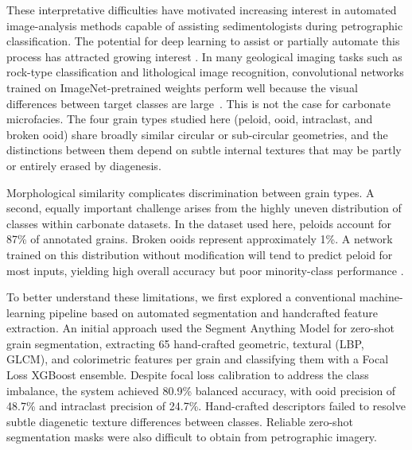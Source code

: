 \documentclass[a4paper,fleqn]{cas-dc}
\begin{document}
These interpretative difficulties have motivated increasing interest in automated image-analysis methods capable of assisting sedimentologists during petrographic classification. The potential for deep learning to assist or partially automate this process has attracted growing interest \citep{koeshidayatullah2020, pireslima2020, liu2020}. In many geological imaging tasks such as rock-type classification and lithological image recognition, convolutional networks trained on ImageNet-pretrained weights perform well because the visual differences between target classes are large~\citep{houshmand2022rock,xu2021deep}. This is not the case for carbonate microfacies. The four grain types studied here (peloid, ooid, intraclast, and broken ooid) share broadly similar circular or sub-circular geometries, and the distinctions between them depend on subtle internal textures that may be partly or entirely erased by diagenesis.

Morphological similarity complicates discrimination between grain types. A second, equally important challenge arises from the highly uneven distribution of classes within carbonate datasets. In the dataset used here, peloids account for 87\% of annotated grains. Broken ooids represent approximately 1\%. A network trained on this distribution without modification will tend to predict peloid for most inputs, yielding high overall accuracy but poor minority-class performance \citep{johnson2019imbalance}.

To better understand these limitations, we first explored a conventional machine-learning pipeline based on automated segmentation and handcrafted feature extraction. An initial approach used the Segment Anything Model \citep{kirillov2023sam} for zero-shot grain segmentation, extracting 65 hand-crafted geometric, textural (LBP, GLCM), and colorimetric features per grain and classifying them with a Focal Loss XGBoost ensemble. Despite focal loss calibration to address the class imbalance, the system achieved 80.9\% balanced accuracy, with ooid precision of 48.7\% and intraclast precision of 24.7\%. Hand-crafted descriptors failed to resolve subtle diagenetic texture differences between classes. Reliable zero-shot segmentation masks were also difficult to obtain from petrographic imagery. %
\end{document}
